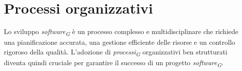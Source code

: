 \section{Processi organizzativi}
Lo sviluppo \textit{software}\textsubscript{\textit{G}} è un processo complesso e multidisciplinare che richiede una pianificazione accurata, una gestione efficiente delle risorse e un controllo rigoroso della qualità. L'adozione di \textit{processi}\textsubscript{\textit{G}} organizzativi ben strutturati diventa quindi cruciale per garantire il successo di un progetto \textit{software}\textsubscript{\textit{G}}. 






